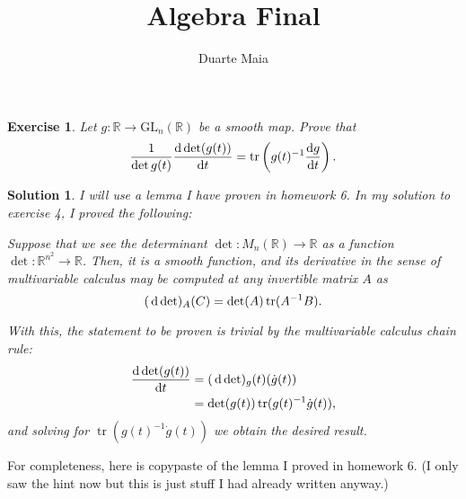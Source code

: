 \documentclass{article}
\title{Algebra Final}
\author{Duarte Maia}
\newtheorem{ex}{Exercise}
\theoremstyle{nonumberplain}
\newtheorem{sol}{Solution}
\newcommand{\R}{\mathbb{R}}
\DeclareMathOperator{\trace}{tr}
\newcommand{\GL}{\mathrm{GL}}
\begin{document}
\maketitle

\begin{ex}
Let $g \colon \R \to \GL_n(\R)$ be a smooth map. Prove that
\begin{equation}
\frac1{\det g(t)} \diff{\det(g(t))}t = \trace\left(g(t)^{-1} \diff g t \right).
\end{equation}
\end{ex}

\begin{sol}
I will use a lemma I have proven in homework 6. In my solution to exercise 4, I proved the following:

Suppose that we see the determinant $\det \colon M_n(\R) \to \R$ as a function $\det \colon \R^{n^2} \to \R$. Then, it is a smooth function, and its derivative in the sense of multivariable calculus may be computed at any invertible matrix $A$ as
\begin{equation}
(\dl \det)_A(C) = \det(A) \trace(A^{-1} B).
\end{equation}

With this, the statement to be proven is trivial by the multivariable calculus chain rule:
\begin{equation}
\begin{aligned}
\diff{\det(g(t))}t &= (\dl \det)_g(t)(\dot g(t))\\
&= \det(g(t)) \trace(g(t)^{-1} \dot g(t)),
\end{aligned}
\end{equation}
and solving for $\trace(g(t)^{-1} \dot g(t))$ we obtain the desired result.
\end{sol}

For completeness, here is copypaste of the lemma I proved in homework 6. (I only saw the hint now but this is just stuff I had already written anyway.)
\end{document}
